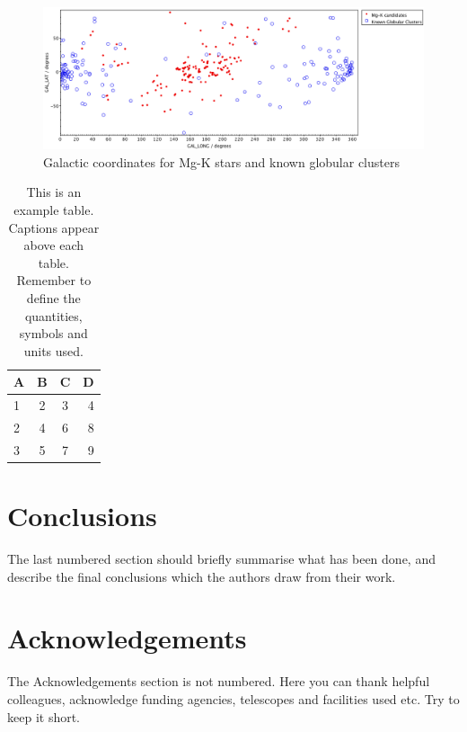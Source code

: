 \documentclass[a4paper,fleqn,usenatbib]{mnras}
\begin{document}
\begin{figure}
	\includegraphics[width=\columnwidth]{galcoord.png}
    \caption{Galactic coordinates for Mg-K stars and known globular clusters}
    \label{mhist}
\end{figure}

\begin{table}
	\centering
	\caption{This is an example table. Captions appear above each table.
	Remember to define the quantities, symbols and units used.}
	\label{tab:example_table}
	\begin{tabular}{lccr} %
		\hline
		A & B & C & D\\
		\hline
		1 & 2 & 3 & 4\\
		2 & 4 & 6 & 8\\
		3 & 5 & 7 & 9\\
		\hline
	\end{tabular}
\end{table}


\section{Conclusions}

The last numbered section should briefly summarise what has been done, and describe
the final conclusions which the authors draw from their work.

\section*{Acknowledgements}

The Acknowledgements section is not numbered. Here you can thank helpful
colleagues, acknowledge funding agencies, telescopes and facilities used etc.
Try to keep it short.



\end{document}

